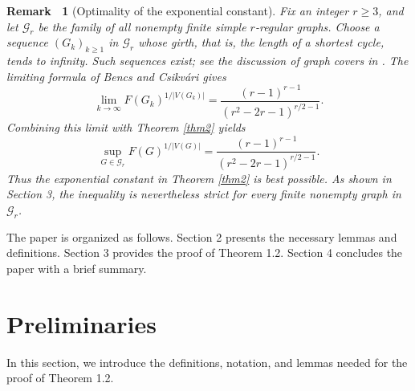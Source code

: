 \documentclass[11pt, a4paper]{article}
\theoremstyle{plain}
\newtheorem{remark}{Remark\ }[section]
\begin{document}
\begin{remark}[Optimality of the exponential constant]\label{rem:sharpness}
Fix an integer $r\geq3$, and let $\mathcal{G}_r$ be the family of all nonempty finite simple $r$-regular graphs.
Choose a sequence $(G_k)_{k\geq1}$ in $\mathcal{G}_r$ whose girth, that is, the length of a shortest cycle, tends to infinity.
Such sequences exist; see the discussion of graph covers in \cite{Bencs2023}.
The limiting formula of Bencs and Csikv\'ari \cite{BencsTutte2022} gives
\[
\lim_{k\to\infty}F(G_k)^{1/|V(G_k)|}
=\frac{(r-1)^{r-1}}{(r^2-2r-1)^{r/2-1}}.
\]
Combining this limit with Theorem \ref{thm2} yields
\[
\sup_{G\in\mathcal{G}_r}F(G)^{1/|V(G)|}
=\frac{(r-1)^{r-1}}{(r^2-2r-1)^{r/2-1}}.
\]
Thus the exponential constant in Theorem \ref{thm2} is best possible.
As shown in Section 3, the inequality is nevertheless strict for every finite nonempty graph in $\mathcal{G}_r$.
\end{remark}
The paper is organized as follows. Section 2 presents the necessary lemmas and definitions. Section 3 provides the proof of Theorem 1.2. Section 4 concludes the paper with a brief summary.





\section{Preliminaries}

In this section, we introduce the definitions, notation, and lemmas needed for the proof of Theorem 1.2.
\end{document}
